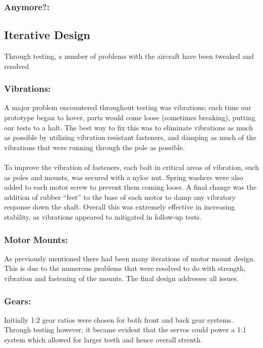 \subsubsection*{Anymore?:}

\subsection{Iterative Design}
Through testing, a number of problems with the aircraft have been tweaked and resolved

\subsubsection*{Vibrations:} A major problem encountered throughout testing was vibrations; each time our prototype began to hover, parts would come loose (sometimes breaking), putting our tests to a halt. The best way to fix this was to eliminate vibrations as much as possible by utilizing vibration resistant fasteners, and damping as much of the vibrations that were running through the pole as possible.\\\\
To improve the vibration of fasteners, each bolt in critical areas of vibration, such as poles and mounts, was secured with a nyloc nut. Spring washers were also added to each motor screw to prevent them coming loose. A final change was the addition of rubber ``feet'' to the base of each motor to damp any vibratory response down the shaft. Overall this was extremely effective in increasing stability, as vibrations appeared to mitigated in follow-up tests.


\subsubsection*{Motor Mounts:} As previously mentioned there had been many iterations of motor mount design. This is due to the numerous problems that were resolved to do with strength, vibration and fastening of the mounts. The final design addresses all issues.

\subsubsection*{Gears:} Initially 1:2 gear ratios were chosen for both front and back gear systems. Through testing however, it became evident that the servos could power a 1:1 system which allowed for larger teeth and hence overall strenth.

